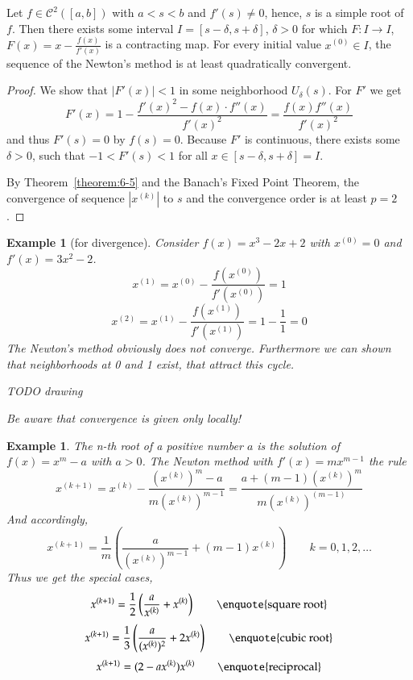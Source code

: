 \documentclass[a4paper]{article}
\newcounter{lecref}[section]
\numberwithin{lecref}{section}
\theoremstyle{break}
\newtheorem{example}[lecref]{Example}
\newcommand{\Abs}[1]{\left|#1\right|}
\begin{document}
\begin{theorem}
  \label{theorem:6-2}
  Let $f \in \mathcal C^2([a, b])$ with $a < s < b$ and $f'(s) \neq 0$, hence, $s$ is a simple root of $f$.
  Then there exists some interval $I = [s - \delta, s + \delta]$, $\delta > 0$ for which $F: I \to I$, $F(x) = x - \frac{f(x)}{f'(x)}$ is a contracting map. For every initial value $x^{(0)} \in I$, the sequence of the Newton's method is at least quadratically convergent.
\end{theorem}

\begin{proof}
  We show that $\Abs{F'(x)} < 1$ in some neighborhood $U_\delta(s)$. For $F'$ we get
  \[ F'(x) = 1 - \frac{f'(x)^2 - f(x) \cdot f''(x)}{f'(x)^2} = \frac{f(x) f''(x)}{f'(x)^2} \]
  and thus $F'(s) = 0$ by $f(s) = 0$. Because $F'$ is continuous, there exists some $\delta > 0$,
  such that $-1 < F'(s) < 1$ for all $x \in [s - \delta, s + \delta] = I$.

  By Theorem~\ref{theorem:6-5} and the Banach's Fixed Point Theorem, the convergence of sequence $\Abs{x^{(k)}}$ to $s$ and the convergence order is at least $p = 2$.
\end{proof}

\begin{example}[for divergence]
  Consider $f(x) = x^3 - 2x + 2$ with $x^{(0)} = 0$ and $f'(x) = 3x^2 - 2$.
  \[ x^{(1)} = x^{(0)} - \frac{f(x^{(0)})}{f'(x^{(0)})} = 1 \]
  \[ x^{(2)} = x^{(1)} - \frac{f(x^{(1)})}{f'(x^{(1)})} = 1 - \frac11 = 0 \]
  The Newton's method obviously does not converge.
  Furthermore we can shown that neighborhoods at 0 and 1 exist, that attract this cycle.

  TODO drawing

  Be aware that convergence is given only locally!
\end{example}

\begin{example}
  \label{example:6-8}
  The n-th root of a positive number $a$ is the solution of $f(x) = x^m - a$ with $a > 0$.
  The Newton method with $f'(x) = mx^{m-1}$ the rule
  \[ x^{(k+1)} = x^{(k)} - \frac{(x^{(k)})^m - a}{m(x^{(k)})^{m-1}} = \frac{a + (m - 1) (x^{(k)})^m}{m (x^{(k)})^{(m-1)}} \]
  And accordingly,
  \[ x^{(k + 1)} = \frac1m \left(\frac{a}{(x^{(k)})^{m-1}} + (m-1) x^{(k)}\right) \qquad k = 0, 1, 2, \dots \]
  Thus we get the special cases,
  \[ x^{(k+1)} = \frac12 \left(\frac{a}{x^{(k)}} + x^{(k)}\right) \qquad \text{\enquote{square root}} \]
  \[ x^{(k+1)} = \frac13 \left(\frac{a}{(x^{(k)})^2} + 2x^{(k)}\right) \qquad \text{\enquote{cubic root}} \]
  \[ x^{(k+1)} = (2 - ax^{(k)}) x^{(k)} \qquad \text{\enquote{reciprocal}} \]
\end{example}
\end{document}
